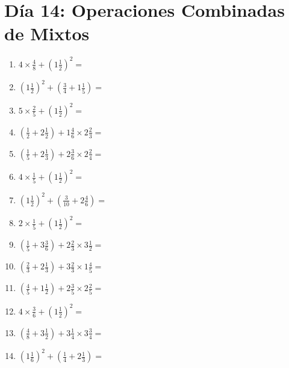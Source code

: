 \documentclass[12pt]{article}
\begin{document}
\section*{Día 14: Operaciones Combinadas de Mixtos}
\begin{enumerate}
\item \large $ 4 \times \frac{4}{8} + (1 \frac{1}{2})^2 = $ \vspace{1.8cm}
\item \large $ (1 \frac{1}{2})^2 + (\frac{3}{4} + 1 \frac{1}{5}) = $ \vspace{1.8cm}
\item \large $ 5 \times \frac{2}{5} + (1 \frac{1}{2})^2 = $ \vspace{1.8cm}
\item \large $ (\frac{1}{2} + 2 \frac{1}{2}) + 1 \frac{4}{6} \times 2 \frac{2}{3} = $ \vspace{1.8cm}
\item \large $ (\frac{1}{5} + 2 \frac{1}{3}) + 2 \frac{3}{6} \times 2 \frac{2}{4} = $ \vspace{1.8cm}
\item \large $ 4 \times \frac{1}{5} + (1 \frac{1}{2})^2 = $ \vspace{1.8cm}
\item \large $ (1 \frac{1}{2})^2 + (\frac{3}{10} + 2 \frac{4}{6}) = $ \vspace{1.8cm}
\item \large $ 2 \times \frac{1}{5} + (1 \frac{1}{2})^2 = $ \vspace{1.8cm}
\item \large $ (\frac{1}{5} + 3 \frac{3}{6}) + 2 \frac{2}{3} \times 3 \frac{1}{2} = $ \vspace{1.8cm}
\item \large $ (\frac{2}{3} + 2 \frac{1}{3}) + 3 \frac{2}{3} \times 1 \frac{4}{5} = $ \vspace{1.8cm}
\newpage
\item \large $ (\frac{4}{5} + 1 \frac{1}{2}) + 2 \frac{3}{5} \times 2 \frac{2}{5} = $ \vspace{1.8cm}
\item \large $ 4 \times \frac{3}{6} + (1 \frac{1}{2})^2 = $ \vspace{1.8cm}
\item \large $ (\frac{4}{8} + 3 \frac{1}{2}) + 3 \frac{1}{4} \times 3 \frac{3}{4} = $ \vspace{1.8cm}
\item \large $ (1 \frac{1}{6})^2 + (\frac{1}{4} + 2 \frac{1}{3}) = $ \vspace{1.8cm}

\end{enumerate}
\end{document}
